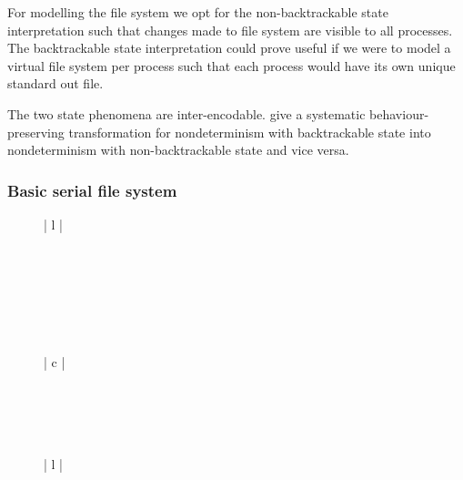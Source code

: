 \documentclass[12pt,phd,lfcs,twoside,openright,logo,leftchapter,normalheadings]{infthesis}
\theoremstyle{plain}
\theoremstyle{definition}
\begin{document}
For modelling the file system we opt for the non-backtrackable state
interpretation such that changes made to file system are visible to
all processes. The backtrackable state interpretation could prove
useful if we were to model a virtual file system per process such that
each process would have its own unique standard out file.

The two state phenomena are inter-encodable. \citet{PauwelsSM19} give
a systematic behaviour-preserving transformation for nondeterminism
with backtrackable state into nondeterminism with non-backtrackable
state and vice versa.


\subsubsection{Basic serial file system}
%
\begin{figure}[t]
  \centering
  \begin{tabular}[t]{| l |}
    \hline
     \\
    \hline
    \\
    \hline
    \\
    \hline
    \\
    \hline
    \\
    \hline
    \\
    \hline
    \\
    \hline
  \end{tabular}
  \hspace{1.5cm}
  \begin{tabular}[t]{| c |}
    \hline
     \\
    \\
    \\
    \hline
    \\
    \\
    \hline
  \end{tabular}
  \hspace{1.5cm}
  \begin{tabular}[t]{| l |}
    \hline
     \\
    \hline
    \strlit{}\\

\end{tabular}
\end{figure}
\end{document}
